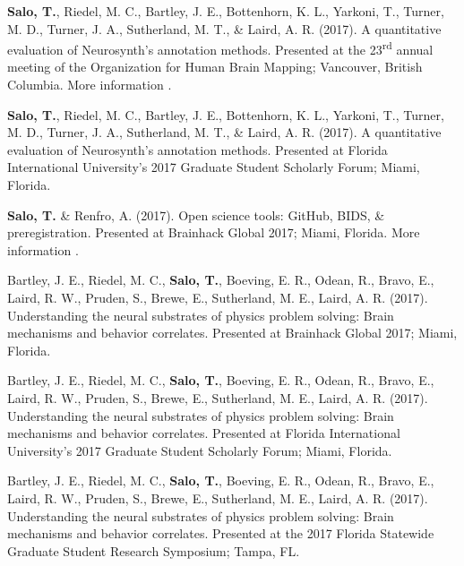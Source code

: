 \documentclass[10pt]{article}
\newcommand{\sectionstyle}{\LARGE \fontfamily{lmr}\selectfont}
\newcommand{\textlink}[3][blue]{\href{#2}{\color{#1}{#3}}}
\begin{document}
\bigskip

\begin{center}\sectionstyle{PRESENTATIONS}\end{center}

\begin{hangparas}{.25in}{1}
\textbf{Salo, T.}, Riedel, M. C., Bartley, J. E., Bottenhorn, K. L., Yarkoni, T.,
Turner, M. D., Turner, J. A., Sutherland, M. T., \& Laird, A. R. (2017).
A quantitative evaluation of Neurosynth's annotation methods. Presented at
the 23\textsuperscript{rd} annual meeting of the Organization for Human Brain
Mapping; Vancouver, British Columbia. More information
\textlink{https://nbclab.github.io/presentations/salo-neurosynth-presentation}{here}.

\bigskip

\textbf{Salo, T.}, Riedel, M. C., Bartley, J. E., Bottenhorn, K. L., Yarkoni, T.,
Turner, M. D., Turner, J. A., Sutherland, M. T., \& Laird, A. R. (2017).
A quantitative evaluation of Neurosynth's annotation methods. Presented at
Florida International University's 2017 Graduate Student Scholarly Forum;
Miami, Florida.

\bigskip

\textbf{Salo, T.} \& Renfro, A. (2017). Open science tools: GitHub, BIDS, \&
preregistration. Presented at Brainhack Global 2017; Miami, Florida. More
information \textlink{https://osf.io/557vf}{here}.

\bigskip

Bartley, J. E., Riedel, M. C., \textbf{Salo, T.}, Boeving, E. R., Odean, R.,
Bravo, E., Laird, R. W., Pruden, S., Brewe, E., Sutherland, M. E., Laird, A. R.
(2017). Understanding the neural substrates of physics problem solving: Brain
mechanisms and behavior correlates. Presented at Brainhack Global 2017; Miami,
Florida.

\bigskip

Bartley, J. E., Riedel, M. C., \textbf{Salo, T.}, Boeving, E. R., Odean, R.,
Bravo, E., Laird, R. W., Pruden, S., Brewe, E., Sutherland, M. E., Laird, A. R.
(2017). Understanding the neural substrates of physics problem solving: Brain
mechanisms and behavior correlates. Presented at Florida International
University's 2017 Graduate Student Scholarly Forum; Miami, Florida.

\bigskip

Bartley, J. E., Riedel, M. C., \textbf{Salo, T.}, Boeving, E. R., Odean, R.,
Bravo, E., Laird, R. W., Pruden, S., Brewe, E., Sutherland, M. E., Laird, A. R.
(2017). Understanding the neural substrates of physics problem solving: Brain
mechanisms and behavior correlates. Presented at the 2017 Florida Statewide
Graduate Student Research Symposium; Tampa, FL.
\end{hangparas}
\end{document}
